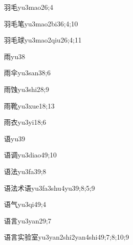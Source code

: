 \begin{verbete}{羽毛}{yu3mao2}{6;4}
\end{verbete}
\begin{verbete}{羽毛笔}{yu3mao2bi3}{6;4;10}
\end{verbete}
\begin{verbete}{羽毛球}{yu3mao2qiu2}{6;4;11}
\end{verbete}
\begin{verbete}{雨}{yu3}{8}
\end{verbete}
\begin{verbete}{雨伞}{yu3san3}{8;6}
\end{verbete}
\begin{verbete}{雨蚀}{yu3shi2}{8;9}
\end{verbete}
\begin{verbete}{雨靴}{yu3xue1}{8;13}
\end{verbete}
\begin{verbete}{雨衣}{yu3yi1}{8;6}
\end{verbete}
\begin{verbete}{语}{yu3}{9}
\end{verbete}
\begin{verbete}{语调}{yu3diao4}{9;10}
\end{verbete}
\begin{verbete}{语法}{yu3fa3}{9;8}
\end{verbete}
\begin{verbete}{语法术语}{yu3fa3shu4yu3}{9;8;5;9}
\end{verbete}
\begin{verbete}{语气}{yu3qi4}{9;4}
\end{verbete}
\begin{verbete}{语言}{yu3yan2}{9;7}
\end{verbete}
\begin{verbete}{语言实验室}{yu3yan2shi2yan4shi4}{9;7;8;10;9}
\end{verbete}
